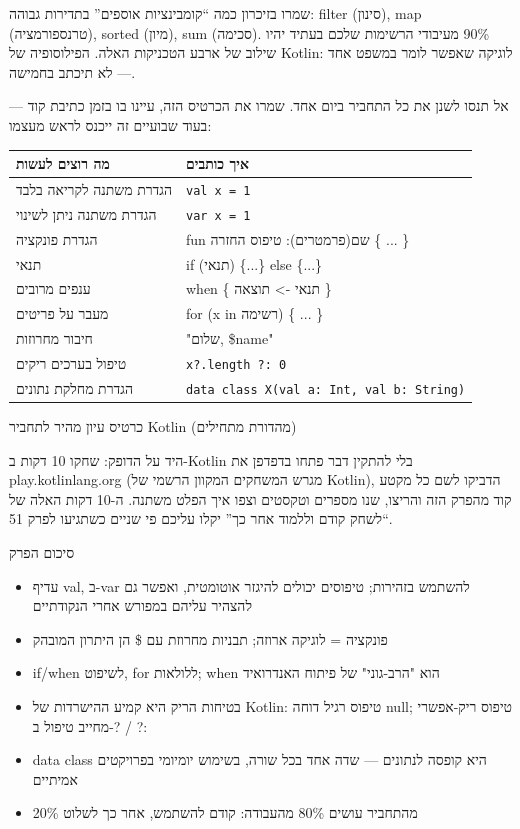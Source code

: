 שמרו בזיכרון כמה “קומבינציות אוספים” בתדירות גבוהה: filter (סינון), map (טרנספורמציה), sorted (מיון), sum (סכימה). 90\% מעיבודי הרשימות שלכם בעתיד יהיו שילוב של ארבע הטכניקות האלה. הפילוסופיה של Kotlin: לוגיקה שאפשר לומר במשפט אחד — לא תיכתב בחמישה.


אל תנסו לשנן את כל התחביר ביום אחד. שמרו את הכרטיס הזה, עיינו בו בזמן כתיבת קוד — בעוד שבועיים זה ייכנס לראש מעצמו:

\begin{center}
\begin{tabularx}{\linewidth}{|X|X|}
\hline
\textbf{מה רוצים לעשות} & \textbf{איך כותבים} \tabularnewline
\hline
הגדרת משתנה לקריאה בלבד & \texttt{val x = 1} \tabularnewline
הגדרת משתנה ניתן לשינוי & \texttt{var x = 1} \tabularnewline
הגדרת פונקציה & fun שם(פרמטרים): טיפוס החזרה \{ ... \} \tabularnewline
תנאי & if (תנאי) \{...\} else \{...\} \tabularnewline
ענפים מרובים & when \{ תנאי -> תוצאה \} \tabularnewline
מעבר על פריטים & for (x in רשימה) \{ ... \} \tabularnewline
חיבור מחרוזות & "שלום, \$name" \tabularnewline
טיפול בערכים ריקים & \texttt{x?.\allowbreak length ?: 0} \tabularnewline
הגדרת מחלקת נתונים & \texttt{data class X(val a: Int, val b: String)} \tabularnewline
\hline
\end{tabularx}
\end{center}

\begin{center}\small\color{gray}כרטיס עיון מהיר לתחביר Kotlin (מהדורת מתחילים)\end{center}

\begin{tcbpractice}{היד על הדופק: שחקו 10 דקות ב-Kotlin בלי להתקין דבר}
פתחו בדפדפן את play.kotlinlang.org (מגרש המשחקים המקוון הרשמי של Kotlin), הדביקו לשם כל מקטע קוד מהפרק הזה והריצו, שנו מספרים וטקסטים וצפו איך הפלט משתנה. ה-10 דקות האלה של “לשחק קודם וללמוד אחר כך” יקלו עליכם פי שניים כשתגיעו לפרק 51.

\end{tcbpractice}

\begin{tcbsummary}{סיכום הפרק}
\begin{itemize}
  \item עדיף val, ב-var להשתמש בזהירות; טיפוסים יכולים להיגזר אוטומטית, ואפשר גם להצהיר עליהם במפורש אחרי הנקודתיים
  \item פונקציה = לוגיקה ארוזה; תבניות מחרוזת עם \$ הן היתרון המובהק
  \item if/when לשיפוט, for ללולאות; when הוא "הרב-גוני" של פיתוח האנדרואיד
  \item בטיחות הריק היא קמיע ההישרדות של Kotlin: טיפוס רגיל דוחה null; טיפוס ריק-אפשרי מחייב טיפול ב-? / ?:
  \item data class היא קופסה לנתונים — שדה אחד בכל שורה, בשימוש יומיומי בפרויקטים אמיתיים
  \item 20\% מהתחביר עושים 80\% מהעבודה: קודם להשתמש, אחר כך לשלוט
\end{itemize}

\end{tcbsummary}
